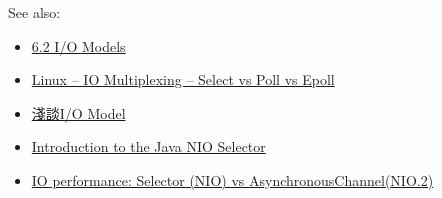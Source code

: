 \documentclass[12pt]{article}
\begin{document}
See also:

\begin{itemize}
\tightlist
\item
  \href{http://www.masterraghu.com/subjects/np/introduction/unix_network_programming_v1.3/ch06lev1sec2.html}{6.2 I/O Models}
\item
  \href{https://devarea.com/linux-io-multiplexing-select-vs-poll-vs-epoll/\#.X0W520lS-L8}{Linux -- IO Multiplexing -- Select vs Poll vs Epoll}
\item
  \href{https://medium.com/@clu1022/\%E6\%B7\%BA\%E8\%AB\%87i-o-model-32da09c619e6}{淺談I/O Model}
\item
  \href{https://www.baeldung.com/java-nio-selector}{Introduction to the Java NIO Selector}
\item
  \href{https://stackoverflow.com/questions/27541283/io-performance-selector-nio-vs-asynchronouschannelnio-2}{IO performance: Selector (NIO) vs AsynchronousChannel(NIO.2)}
\end{itemize}
\end{document}
